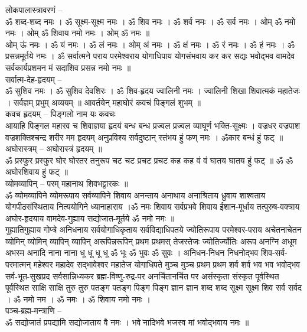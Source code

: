 \documentclass[12pt]{article}
\begin{document}
{{{लोकपालास्त्रावरणं – \\[5pt]
ॐ शब्द-शब्द नमः । ॐ सूक्ष्म-सूक्ष्म नमः । ॐ शिव नमः । ॐ शर्व नमः । ॐ सर्व नमः । ओम् ॐ नमो नमः । ओम् ॐ शिवाय नमो नमः । ओम् ॐ नमः ॥\\
ओम् ऊं नमः । ॐ यं नमः । ॐ लं नमः । ओम् अं नमः । ॐ क्षं नमः । ॐ रं नमः । ॐ हं नमः । ॐ प्रसन्नमूर्तये नमः । ॐ सर्वात्मने पराय परमेश्वराय योगाधिपाय योगसंभवाय कर कर सद्यः भवोद्भव वामदेव सर्वकार्यप्रशमन मं सदाशिव प्रसन्न नमो नमः ॥\\[5pt]
सर्वात्म-देह-हृदयम् – \\[5pt]
ॐ सुशिव नमः । ॐ सुशिव देवशिरः । ॐ शिव-हृदय ज्वालिनी नमः । ज्वालिनी शिखा शिवात्मकं महातेजः । सर्वज्ञम् प्रभुम् अव्ययम् ॥ आवर्तयेन् महाघोरं कवचं पिङ्गलं शुभम् ॥\\[5pt] 
कवच हृदयम् – पिङ्गलो नाम यः कवचः \\[5pt]
आयाहि पिङ्गल महारव च शिवाज्ञया हृदयं बन्ध बन्ध प्रज्वल प्रज्वल व्याघूर्ण भक्ति-सुक्ष्मः । वज्रधर वज्रपाश वज्रशक्तिश्चन्द्र शरीर मम हृदयम् अनुप्रविश्य सर्वदुष्टान् स्तंभय हुं फण् नमः । ॐकार बन्धं हुं फट् ॥\\[5pt] 
अघोरास्त्रम् – अघोरास्त्रं हृदयम् ॥ \\[5pt] 
ॐ प्रस्फुर प्रस्फुर घोर घोरतर तनुरूप चट चट प्रचट प्रचट कह कह वं वं घातय घातय हुं फट् ॥ ॐ ॐ अघोरशिवाय हुं फट् ॥  \\[5pt]
व्योमव्यापिन् – परम् महानाथ शिवभट्टारकः ॥ \\[5pt] 
ॐ व्योमव्यापिने व्योमरूपाय सर्वव्यापिने शिवाय अनन्ताय अनाथाय अनाश्रिताय ध्रुवाय शाश्वताय योगपीठसंस्थिताय नित्ययोगिने ध्यानाहाराय ।ॐ नमः शिवाय सर्वप्रभवे शिवाय ईशान-मूर्धाय तत्पुरुष-वक्त्राय अघोर-हृदयाय वामदेव-गुह्याय सद्योजात-मूर्तये ॐ नमो नमः ॥\\[5pt]
गुह्यातिगुह्याय गोप्त्रे अनिधनाय सर्वयोगाधिकृताय सर्वविद्याधिपतये ज्योतिरूपाय परमेश्वर-पराय अचेतनाचेतन व्योमिन् व्योमिन् व्यापिन् व्यापिन् अरूपिन्नरूपिन् प्रथम प्रथमस् तेजस्तेजः ज्योतिर्ज्योतिः अरूप अनग्नि अधूम अभस्म अनादि नाना नाना धू धू धू धू ॐ भूः ॐ भुवः ॐ सुवः । अनिधन-निधन निधनोद्भव शिव-सर्व-परमात्मन् महेश्वर महादेव सद्भावेश्वर महातेज योगाधिपते मुञ्च मुञ्च प्रथम प्रथम शर्व शर्व भव भव भवोद्भव सर्व-भूत-सुखप्रद सर्वसान्निध्यकर ब्रह्म-विष्णु-रुद्र-पर अनर्चितानर्चित पर असंस्कृता संस्कृत पूर्वस्थित पूर्वस्थित साक्षि साक्षि तुरु तुरु पतङ्ग पतङ्ग पिङ्ग पिङ्ग ज्ञान ज्ञान शब्द शब्द सूक्ष्म सूक्ष्म शिव सर्व सर्वद । ॐ नमो नम । ॐ नमः । ॐ शिवाय नमो नमः । \\[5pt] 
पञ्च-ब्रह्म-मन्त्राणि – \\[5pt] 
ॐ सद्योजातं प्रपद्यामि सद्योजाताय वै नमः । भवे ̍नादिभवे भजस्व मां भवोद्भवाय नमः ॥\\[5pt] 
}}}
\end{document}
